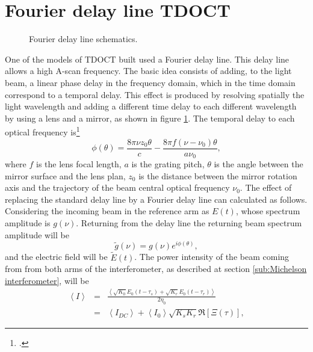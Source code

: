 \documentclass[12pt,twoside,english]{book}
\renewcommand{\~}{\perispomeni}%
\numberwithin{equation}{section}
\numberwithin{figure}{section}
\begin{document}
\section{Fourier delay line TDOCT}
\begin{figure}
\centering
\caption{Fourier delay line schematics.}
\label{fig:fdl}
\end{figure}

One of the models of \gls{TDOCT} built used a Fourier delay line. This delay line allows a high A-scan frequency. The basic idea consists of adding, to the light beam, a linear phase delay in the frequency domain, which in the time domain correspond to a temporal delay. This effect is produced by resolving spatially the light wavelength and adding a different time delay to each different wavelength by using a lens and a mirror, as shown in figure \ref{fig:fdl}. The temporal delay to each optical frequency is\footcite{Rollins:1998p1700}
\begin{equation}
\phi\left(\theta\right)=\frac{8\pi\nu z_0\theta}{c}-\frac{8\pi f\left(\nu-\nu_0\right)\theta}{a\nu_0},
\label{eq:delay frequency}
\end{equation}
where $f$ is the lens focal length, $a$ is the grating pitch, $\theta$ is the angle between the mirror surface and the lens plan, $z_0$ is the distance between the mirror rotation axis and the trajectory of the beam central optical frequency $\nu_0$. The effect of replacing the standard delay line by a Fourier delay line can calculated as follows. Considering the incoming beam in the reference arm as $E\left(t\right)$, whose spectrum amplitude is $g\left(\nu\right)$. Returning from the delay line the returning beam spectrum amplitude will be
\begin{equation}
\tilde{g}\left(\nu\right)=g\left(\nu\right)e^{i\phi\left(\theta\right)},
\label{eq:fdl return spectrum amplitude}
\end{equation}
and the electric field will be $\tilde{E}\left(t\right)$. The power intensity of the beam coming from from both arms of the interferometer, as described at section \ref{sub:Michelson interferometer}, will be
\begin{eqnarray}
\left<I\right>&=&\frac{\left<\sqrt{K_{0}}E_{0}\left(t-\tau_{s}\right)+\sqrt{K_{r}}E_{0}\left(t-\tau_{r}\right)\right>}{2\eta_0}\\
&=&\left<I_{DC}\right>+\left<I_0\right>\sqrt{K_s K_r}\Re\left[{\Xi\left(\tau\right)}\right],
\label{eq:fdl interferometer output intensity}
\end{eqnarray}
\end{document}
